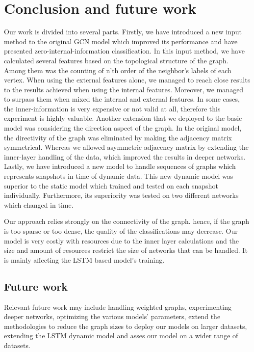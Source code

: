 \chapter{Conclusion and future work}
\label{chap:conclusion}

Our work is divided into several parts.
Firstly, we have introduced a new input method to the original GCN model which improved its performance and have presented zero-internal-information classification.
In this input method, we have calculated several features based on the topological structure of the graph. Among them was the counting of n'th order of the neighbor's labels of each vertex.
When using the external features alone, we managed to reach close results to the results achieved when using the internal features. Moreover, we managed to surpass them when mixed the internal and external features.
In some cases, the inner-information is very expensive or not valid at all, therefore this experiment is highly valuable.
Another extension that we deployed to the basic model was considering the direction aspect of the graph. In the original model, the directivity of the graph was eliminated by making the adjacency matrix symmetrical. Whereas we allowed asymmetric adjacency matrix by extending the inner-layer handling of the data, which improved the results in deeper networks.
Lastly, we have introduced a new model to handle sequences of graphs which represents snapshots in time of dynamic data.
This new dynamic model was superior to the static model which trained and tested on each snapshot individually. Furthermore, its superiority was tested on two different networks which changed in time.

Our approach relies strongly on the connectivity of the graph. hence, if the graph is too sparse or too dense, the quality of the classifications may decrease.
Our model is very costly with resources due to the inner layer calculations and the size and amount of resources restrict the size of networks that can be handled. It is mainly affecting the LSTM based model's training.

\section{Future work}
Relevant future work may include handling weighted graphs, experimenting deeper networks, optimizing the various models' parameters, extend the methodologies to reduce the graph sizes to deploy our models on larger datasets, extending the LSTM dynamic model and asses our model on a wider range of datasets.
